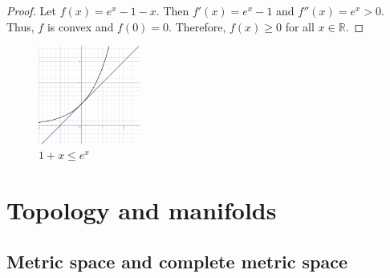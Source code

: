 \documentclass[11pt]{book} %
\begin{document}
\begin{proof}
Let $f(x) = e^x - 1 - x$. Then $f'(x) = e^x - 1$ and $f''(x) = e^x > 0$. Thus, $f$ is convex and $f(0) = 0$. Therefore, $f(x) \geq 0$ for all $x \in \mathbb{R}$.
\end{proof}

\begin{figure}[H]
    \centering
    \includegraphics[width=0.3\textwidth]{Figs/1+x_leq_e^x.png}
    \caption{$1 + x \leq e^x$}
\end{figure}





\chapter{Topology and manifolds}

\section{Metric space and complete metric space}
\end{document}
